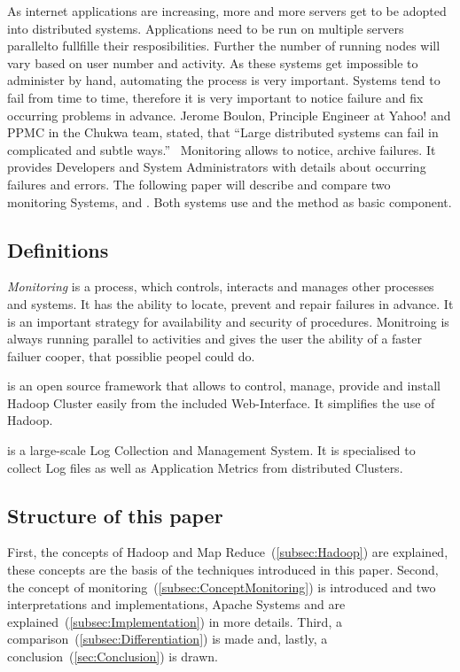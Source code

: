 As internet applications are increasing, more and more servers get to be adopted into distributed systems. Applications need to be run on multiple servers parallelto fullfille their resposibilities. Further the number of running nodes will vary based on user number and activity. As these systems get impossible to administer by hand, automating the process is very important. Systems tend to fail from time to time, therefore it is very important to notice failure and fix occurring problems in advance. Jerome Boulon, Principle Engineer at Yahoo! and PPMC in the Chukwa team, stated, that ``Large distributed systems can fail in complicated and subtle ways.''~\cite{Boulonb} Monitoring allows to notice, archive failures. It provides Developers and System Administrators with details about occurring failures and errors. The following paper will describe and compare two monitoring Systems, \amb and \chuk. Both systems use \hadoop and the \mr method as basic component.


\subsection{Definitions}

\textit{Monitoring} is a process, which controls, interacts and manages other processes and systems. It has the ability to locate, prevent and repair failures in advance. It is an important strategy for availability and security of procedures. Monitroing is always running parallel to activities and gives the user the ability of a faster failuer cooper, that possiblie peopel could do.

\amb is an open source framework that allows to control, manage, provide and install Hadoop Cluster easily from the included Web-Interface. It simplifies the use of Hadoop.

\chuk is a large-scale Log Collection and Management System. It is specialised to collect Log files as well as Application Metrics from distributed Clusters.

\subsection{Structure of this paper}
First, the concepts of Hadoop and Map Reduce~(\ref{subsec:Hadoop}) are explained, these concepts are the basis of the techniques introduced in this paper. 
Second, the concept of monitoring~(\ref{subsec:ConceptMonitoring}) is introduced and two interpretations and implementations, Apache Systems \amb and \chuk are explained~(\ref{subsec:Implementation}) in more details. 
Third, a comparison~(\ref{subsec:Differentiation}) is made and, lastly, a conclusion~(\ref{sec:Conclusion}) is drawn.

